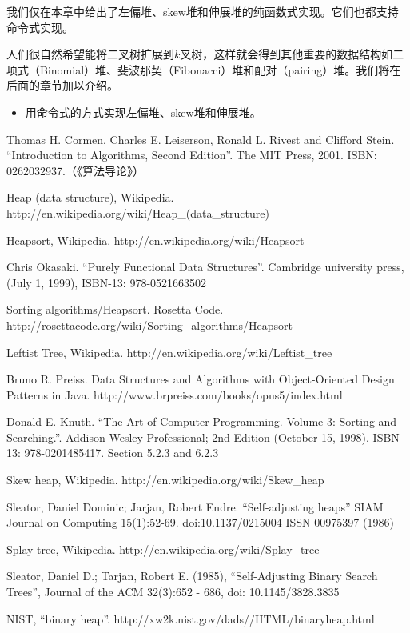 \documentclass[UTF8]{article}
\begin{document}
我们仅在本章中给出了左偏堆、skew堆和伸展堆的纯函数式实现。它们也都支持命令式实现。

人们很自然希望能将二叉树扩展到$k$叉树，这样就会得到其他重要的数据结构如二项式（Binomial）堆、斐波那契（Fibonacci）堆和配对（pairing）堆。我们将在后面的章节加以介绍。

\begin{Exercise}
\begin{itemize}
\item 用命令式的方式实现左偏堆、skew堆和伸展堆。
\end{itemize}
\end{Exercise}

\ifx\wholebook\relax \else
\begin{thebibliography}{99}

Thomas H. Cormen, Charles E. Leiserson, Ronald L. Rivest and Clifford Stein. ``Introduction to Algorithms, Second Edition''. The MIT Press, 2001. ISBN: 0262032937.（《算法导论》）

Heap (data structure), Wikipedia. http://en.wikipedia.org/wiki/Heap\_(data\_structure)

Heapsort, Wikipedia. http://en.wikipedia.org/wiki/Heapsort

Chris Okasaki. ``Purely Functional Data Structures''. Cambridge university press, (July 1, 1999), ISBN-13: 978-0521663502

Sorting algorithms/Heapsort. Rosetta Code. http://rosettacode.org/wiki/Sorting\_algorithms/Heapsort

Leftist Tree, Wikipedia. http://en.wikipedia.org/wiki/Leftist\_tree

Bruno R. Preiss. Data Structures and Algorithms with Object-Oriented Design Patterns in Java. http://www.brpreiss.com/books/opus5/index.html

Donald E. Knuth. ``The Art of Computer Programming. Volume 3: Sorting and Searching.''. Addison-Wesley Professional;
2nd Edition (October 15, 1998). ISBN-13: 978-0201485417. Section 5.2.3 and 6.2.3

Skew heap, Wikipedia. http://en.wikipedia.org/wiki/Skew\_heap

Sleator, Daniel Dominic; Jarjan, Robert Endre. ``Self-adjusting heaps'' SIAM Journal on Computing 15(1):52-69. doi:10.1137/0215004 ISSN 00975397 (1986)

Splay tree, Wikipedia. http://en.wikipedia.org/wiki/Splay\_tree

Sleator, Daniel D.; Tarjan, Robert E. (1985), ``Self-Adjusting Binary Search Trees'', Journal of the ACM 32(3):652 - 686, doi: 10.1145/3828.3835

NIST, ``binary heap''. http://xw2k.nist.gov/dads//HTML/binaryheap.html

\end{thebibliography}
\end{document}
